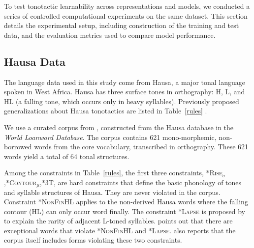 To test tonotactic learnability across representations and models,
we conducted a series of controlled computational experiments on the same
dataset.
This section details the experimental setup,
including construction of the training and test data, and
the evaluation metrics used to compare model performance.

\subsection{Hausa Data}

The language data used in this study come from Hausa, a major tonal
language spoken in West Africa.
Hausa has three surface tones in orthography: H, L,
and HL (a falling tone, which occurs only in heavy syllables).
Previously proposed generalizations about Hausa tonotactics are listed
in Table~\ref{rules} \citep{Newmanbook,leben1996tonal,zoll2003optimal}.

% 

We use a curated corpus from \citet{li2025learning},
constructed from the Hausa database \citep{wold-4}
in the \textit{World Loanword Database}.
The corpus contains 621 mono-morphemic, non-borrowed words from the
core vocabulary, transcribed in orthography.
These 621 words yield a total of 64 tonal structures.

Among the constraints in Table~\ref{rules}, the first three constraints,
\textsc{*Rise$_\sigma$},\textsc{*Contour$_{\mu}$},\textsc{*3T}, are hard
constraints that define the basic phonology of tones and syllable 
structures of Hausa.
They are never violated in the corpus.
Constraint \textsc{*NonFinHL} applies to the non-derived Hausa words
where the falling contour (HL) can only occur word finally.
The constraint \textsc{*Lapse} is proposed by \citet{zoll2003optimal}
to explain the rarity of adjacent L-toned syllables.
\citet{Newmanbook} points out that there are exceptional words that
violate \textsc{*NonFinHL} and \textsc{*Lapse}.
\citet{li2025learning} also reports that the corpus itself
includes forms violating these two constraints.


